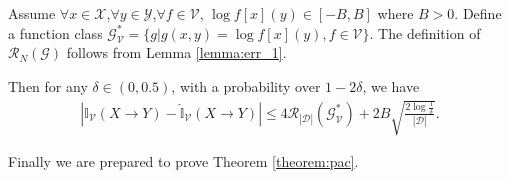 \begin{lemma}
\label{lemma:err_3}
Assume $\forall x \in \mathcal X$,$\forall y \in \mathcal Y$,$\forall f \in \mathcal V$, $\log f[x](y) \in [-B,B]$ where $B > 0$. Define a function class $\mathcal G_{\mathcal V}^* = \{g|g(x,y) = \log f[x](y), f\in \mathcal V\}$. The definition of $\mathscr R_{N}(\mathcal G)$ follows from Lemma \ref{lemma:err_1}. 

Then for any $\delta \in (0,0.5)$, with a probability over $1 - 2\delta$,  we have
\begin{align}
    \left|\mathbb I_{\mathcal V}(X\rightarrow Y)  -  \hat{\mathbb I}_{\mathcal V}(X\rightarrow Y) \right| 
    \leq 4\mathscr R_{|\mathcal D|}(\mathcal G_{\mathcal V}^*) + 2B\sqrt{\frac{2\log{\frac{1}{\delta}}}{|\mathcal D|}}.
\end{align}
\end{lemma}

Finally we are prepared to prove Theorem \ref{theorem:pac}.



